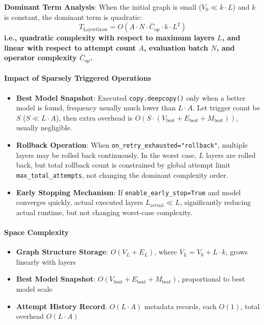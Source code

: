 \textbf{Dominant Term Analysis}: When the initial graph is small ($V_0 \ll k \cdot L$) and $k$ is constant, the dominant term is quadratic:
\begin{equation}
    T_{\mathrm{LayerGrow}} = O(A \cdot N \cdot \bar{C}_{\mathrm{op}} \cdot k \cdot L^2)
\end{equation}
\textbf{i.e., quadratic complexity with respect to maximum layers $L$, and linear with respect to attempt count $A$, evaluation batch $N$, and operator complexity $\bar{C}_{\mathrm{op}}$.}

\paragraph{Impact of Sparsely Triggered Operations}
\begin{itemize}
    \item \textbf{Best Model Snapshot}: Executed \texttt{copy.deepcopy()} only when a better model is found, frequency usually much lower than $L \cdot A$. Let trigger count be $S$ ($S \ll L \cdot A$), then extra overhead is $O(S \cdot (V_{\mathrm{best}} + E_{\mathrm{best}} + M_{\mathrm{best}}))$, usually negligible.
    \item \textbf{Rollback Operation}: When \texttt{on\_retry\_exhausted="rollback"}, multiple layers may be rolled back continuously. In the worst case, $L$ layers are rolled back, but total rollback count is constrained by global attempt limit \texttt{max\_total\_attempts}, not changing the dominant complexity order.
    \item \textbf{Early Stopping Mechanism}: If \texttt{enable\_early\_stop=True} and model converges quickly, actual executed layers $L_{\mathrm{actual}} \ll L$, significantly reducing actual runtime, but not changing worst-case complexity.
\end{itemize}

\paragraph{Space Complexity}
\begin{itemize}
    \item \textbf{Graph Structure Storage}: $O(V_L + E_L)$, where $V_L = V_0 + L \cdot k$, grows linearly with layers
    \item \textbf{Best Model Snapshot}: $O(V_{\mathrm{best}} + E_{\mathrm{best}} + M_{\mathrm{best}})$, proportional to best model scale
    \item \textbf{Attempt History Record}: $O(L \cdot A)$ metadata records, each $O(1)$, total overhead $O(L \cdot A)$
\end{itemize}

